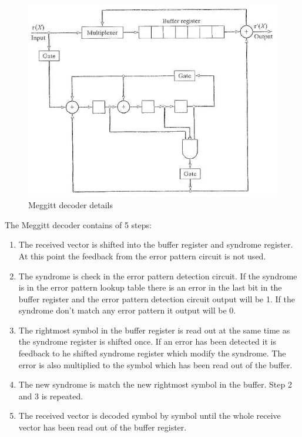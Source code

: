 \documentclass[Main]{subfiles}
\begin{document}
\begin{figure}[htbp]
\centering
\includegraphics[width=0.7\linewidth]{./Picture/Meggitt_decoder_example}
\caption[Meggit Decoder example]{Meggitt decoder details}
\label{fig:Meggitt_decoder_example}
\end{figure}

The Meggitt decoder contains of 5 steps:
\begin{enumerate}
\item The received vector is shifted into the buffer register and syndrome register.
At this point the feedback from the error pattern circuit is not used.
\item The syndrome is check in the error pattern detection circuit.
If the syndrome is in the error pattern lookup table there is an error in the last bit in the buffer register and the error pattern detection circuit output will be 1.
If the syndrome don't match any error pattern it output will be 0.
\item The rightmost symbol in the buffer register is read out at the same time as the syndrome register is shifted once.
If an error has been detected it is feedback to he shifted syndrome register which modify the syndrome.
The error is also multiplied to the symbol which has been read out of the buffer. 
\item The new syndrome is match the new rightmost symbol in the buffer.
Step 2 and 3 is repeated.
\item The received vector is decoded symbol by symbol until the whole receive vector has been read out of the buffer register.
\end{enumerate}
\end{document}
